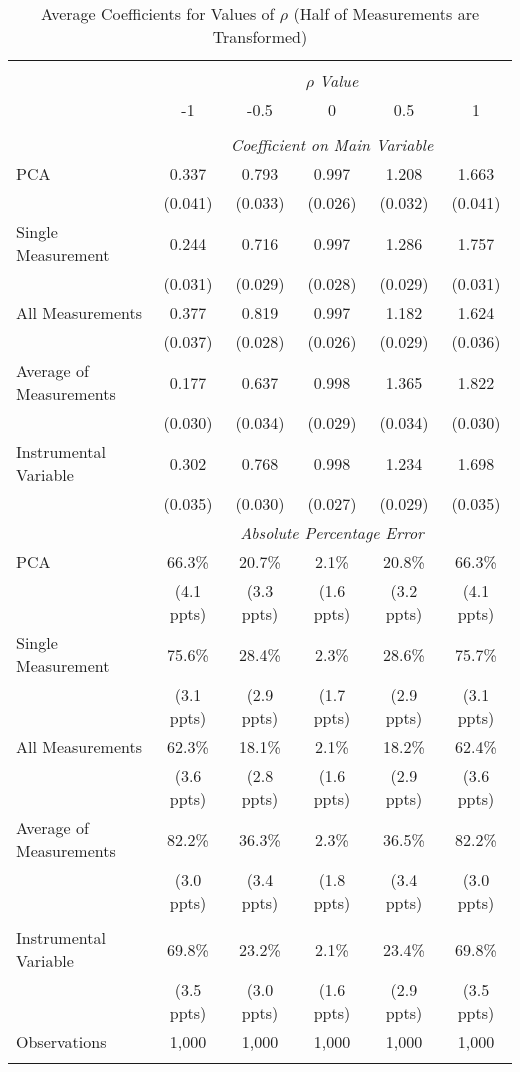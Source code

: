 \begin{table}[!htbp] \centering
  \caption{Average Coefficients for Values of $\rho$ (Half of Measurements are Transformed) \label{sim_rho_5_exp}}
\begin{tabular}{@{\extracolsep{5pt}}lccccc}
\\[-1.8ex]\hline
\hline \\[-1.8ex]
& \multicolumn{5}{c}{$\rho$ \textit{ Value}} \
\cr \
\\[-1.8ex] & -1 & -0.5 & 0 & 0.5 & 1 \\
\hline \\[-1.8ex]
& \multicolumn{5}{c}{\textit{Coefficient on Main Variable}} \\
PCA & 0.337 & 0.793 & 0.997 & 1.208 & 1.663  \\
& (0.041) & (0.033) & (0.026) & (0.032) & (0.041)\\
Single Measurement & 0.244 & 0.716 & 0.997 & 1.286 & 1.757  \\
& (0.031) & (0.029) & (0.028) & (0.029) & (0.031)\\
All Measurements & 0.377 & 0.819 & 0.997 & 1.182 & 1.624  \\
  & (0.037) & (0.028) & (0.026) & (0.029) & (0.036)\\
 Average of Measurements & 0.177 & 0.637 & 0.998 & 1.365 & 1.822  \\
  & (0.030) & (0.034) & (0.029) & (0.034) & (0.030)\\
  Instrumental Variable & 0.302 & 0.768 & 0.998 & 1.234 & 1.698 \\
  & (0.035) & (0.030) & (0.027) & (0.029) & (0.035) \\
  
& \multicolumn{5}{c}{\textit{Absolute Percentage Error}} \\
  PCA & 66.3\% & 20.7\% & 2.1\% & 20.8\% & 66.3\% \\
   & (4.1 ppts) & (3.3 ppts) & (1.6 ppts) & (3.2 ppts) & (4.1 ppts)\\
   Single Measurement & 75.6\% & 28.4\% & 2.3\% & 28.6\% & 75.7\%  \\
   & (3.1 ppts) & (2.9 ppts) & (1.7 ppts) & (2.9 ppts) & (3.1 ppts)\\
 All Measurements & 62.3\% & 18.1\% & 2.1\% & 18.2\% & 62.4\%  \\
  & (3.6 ppts) & (2.8 ppts) & (1.6 ppts) & (2.9 ppts) & (3.6 ppts)\\
  Average of Measurements & 82.2\% & 36.3\% & 2.3\% & 36.5\% & 82.2\% \\
  & (3.0 ppts) & (3.4 ppts) & (1.8 ppts) & (3.4 ppts) & (3.0 ppts)\\
  \hline \\[-1.8ex]
  Instrumental Variable & 69.8\% & 23.2\% & 2.1\% & 23.4\% & 69.8\% \\
  & (3.5 ppts) & (3.0 ppts) & (1.6 ppts) & (2.9 ppts) & (3.5 ppts) \\
  
 Observations & 1,000 & 1,000 & 1,000 & 1,000 & 1,000\\
\hline
\hline \\[-1.8ex]
\end{tabular}
\end{table}